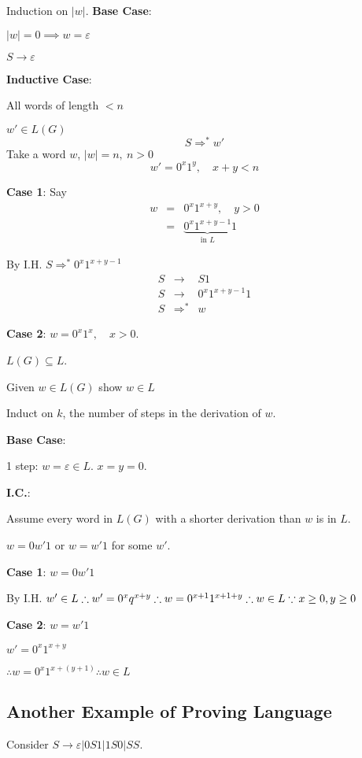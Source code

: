 \documentclass[12pt]{article}
\begin{document}
Induction on $|w|$.
\textbf{Base Case}: 

$|w| = 0 \implies w = \varepsilon$

$S \to \varepsilon$

\textbf{Inductive Case}:

All words of length $<n$

$w' \in L(G)$
\[
S \Rightarrow^*w'
\]
Take a word $w$, $|w|=n,\ n>0$
\[
w' = 0^x1^y,\quad x+y<n
\]

\textbf{Case 1}:
Say 
\begin{eqnarray*}
	w &=&  0^{x}1^{x+y},\quad y>0\\
	&=& \underbrace{0^x1^{x+y-1}}_{\text{in $L$}}1
\end{eqnarray*}

By I.H. $S \Rightarrow^* 0^x1^{x+y-1}$
\begin{eqnarray*}
	S &\to& S1\\
	S &\to& 0^x1^{x+y-1}1\\
	S &\Rightarrow^*& w
\end{eqnarray*}

\textbf{Case 2}: $w = 0^x1^x,\quad x>0$.

$L(G) \subseteq L$.

Given $w \in L(G)$ show $w \in L$

Induct on $k$, the number of steps in the derivation of $w$.

\textbf{Base Case}:

1 step: $w = \varepsilon \in L$. $x = y = 0.$

\textbf{I.C.}:

Assume every word in $L(G)$ with a shorter derivation than $w$ is in $L$.

$w = 0w'1$ or $w = w'1$ for some $w'$.

\textbf{Case 1}: $w = 0w'1$

By I.H. $w'\in L\\
\therefore w' = 0^{x}q^{x+y}\\
\therefore w = 0^{x+1}1^{x+1+y}\\
\therefore w \in L \because x\ge0,y\ge0$

\textbf{Case 2}: $w = w'1$

$w' = 0^x1^{x+y}$

$\therefore w = 0^x1^{x+(y+1)} \therefore w \in L $

\subsection{Another Example of Proving Language}
Consider $S \to \varepsilon|0S1|1S0|SS$.
\end{document}
